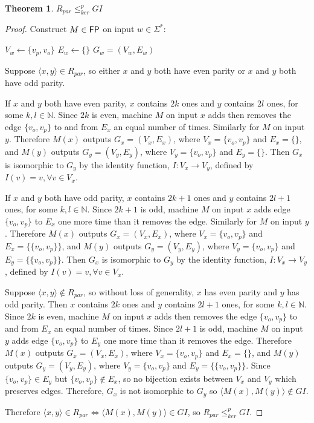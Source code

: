 \documentclass{article}
\newtheorem{theorem}{Theorem}[section]
\theoremstyle{definition} \newtheorem{definition}[definition]{Definition}
\newcommand{\sigmastar}{\Sigma^{*}} %
\newcommand{\kr}{\leq^{p}_{ker}} %
\newcommand{\pair}[2]{\langle#1,#2\rangle} %
\begin{document}
\begin{theorem}\label{thm:rpar_gi}$R_{par}\kr GI$\end{theorem}
\begin{proof}
  Construct $M\in {\ensuremath{\mathsf{FP}}}$ on input $w\in\sigmastar$:\\
  \begin{algorithm}[H]
    $V_w\gets\{v_p, v_o\}$\;
    $E_w\gets\{\}$ \;
    \Return $G_w=(V_w, E_w)$
  \end{algorithm}

  Suppose $\pair{x}{y}\in R_{par}$, so either $x$ and $y$ both have even parity
  or $x$ and $y$ both have odd parity.

  If $x$ and $y$ both have even parity, $x$ contains $2k$ ones and $y$ contains
  $2l$ ones, for some $k,l\in\mathbb{N}$. Since $2k$ is even, machine $M$ on
  input $x$ adds then removes the edge $\{v_o, v_p\}$ to and from $E_x$ an
  equal number of times. Similarly for $M$ on input $y$. Therefore $M(x)$
  outputs $G_x=(V_x, E_x)$, where $V_x=\{v_o, v_p\}$ and $E_x=\{\}$, and $M(y)$
  outputs $G_y=(V_y, E_y)$, where $V_y=\{v_o, v_p\}$ and $E_y=\{\}$. Then $G_x$
  is isomorphic to $G_y$ by the identity function, $I\colon V_x\to V_y$,
  defined by $I(v)=v, \forall v\in V_x$.

  If $x$ and $y$ both have odd parity, $x$ contains $2k+1$ ones and $y$
  contains $2l+1$ ones, for some $k,l\in\mathbb{N}$. Since $2k+1$ is odd,
  machine $M$ on input $x$ adds edge $\{v_o, v_p\}$ to $E_x$ one more time than
  it removes the edge. Similarly for $M$ on input $y$. Therefore $M(x)$ outputs
  $G_x=(V_x, E_x)$, where $V_x=\{v_o, v_p\}$ and $E_x=\{\{v_o, v_p\}\}$, and
  $M(y)$ outputs $G_y=(V_y, E_y)$, where $V_y=\{v_o, v_p\}$ and $E_y=\{\{v_o,
  v_p\}\}$. Then $G_x$ is isomorphic to $G_y$ by the identity function,
  $I\colon V_x\to V_y$, defined by $I(v)=v, \forall v\in V_x$.

  Suppose $\pair{x}{y}\notin R_{par}$, so without loss of generality, $x$ has
  even parity and $y$ has odd parity. Then $x$ contains $2k$ ones and $y$
  contains $2l+1$ ones, for some $k,l\in\mathbb{N}$. Since $2k$ is even,
  machine $M$ on input $x$ adds then removes the edge $\{v_o, v_p\}$ to and
  from $E_x$ an equal number of times. Since $2l+1$ is odd, machine $M$ on
  input $y$ adds edge $\{v_o, v_p\}$ to $E_y$ one more time than it removes the
  edge. Therefore $M(x)$ outputs $G_x=(V_x, E_x)$, where $V_x=\{v_o, v_p\}$ and
  $E_x=\{\}$, and $M(y)$ outputs $G_y=(V_y, E_y)$, where $V_y=\{v_o, v_p\}$ and
  $E_y=\{\{v_o, v_p\}\}$. Since $\{v_o, v_p\}\in E_y$ but $\{v_o, v_p\}\notin
  E_x$, so no bijection exists between $V_x$ and $V_y$ which preserves
  edges. Therefore, $G_x$ is not isomorphic to $G_y$ so
  $\pair{M(x)}{M(y)}\notin GI$.

  Therefore $\pair{x}{y}\in R_{par} \iff \pair{M(x)}{M(y)} \in GI$, so $R_{par}
  \kr GI$.
\end{proof}
\end{document}
